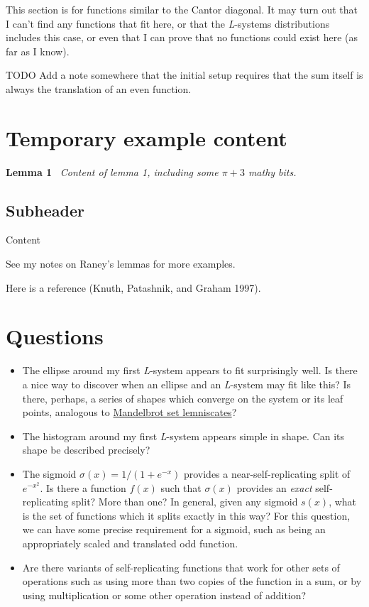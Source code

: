 \documentclass[20pt,]{extarticle}
\providecommand{\tightlist}{%
  \setlength{\itemsep}{0pt}\setlength{\parskip}{0pt}}
\begin{document}
This section is for functions similar to the Cantor diagonal. It may
turn out that I can't find any functions that fit here, or that the
\emph{L}-systems distributions includes this case, or even that I can
prove that no functions could exist here (as far as I know).

TODO Add a note somewhere that the initial setup requires that the sum
itself is always the translation of an even function.

\section{Temporary example content}\label{temporary-example-content}

\textbf{Lemma 1}~ \emph{Content of lemma 1, including some \(\pi+3\)
mathy bits.}

\subsection{Subheader}\label{subheader}

Content

See my notes on Raney's lemmas for more examples.

Here is a reference (Knuth, Patashnik, and Graham 1997).

\section{Questions}\label{questions}

\begin{itemize}
\tightlist
\item
  The ellipse around my first \emph{L}-system appears to fit
  surprisingly well. Is there a nice way to discover when an ellipse and
  an \emph{L}-system may fit like this? Is there, perhaps, a series of
  shapes which converge on the system or its leaf points, analogous to
  \href{http://mathworld.wolfram.com/MandelbrotSetLemniscate.html}{Mandelbrot
  set lemniscates}?
\item
  The histogram around my first \emph{L}-system appears simple in shape.
  Can its shape be described precisely?
\item
  The sigmoid \(\sigma(x)=1/(1+e^{-x})\) provides a
  near-self-replicating split of \(e^{-x^2}\). Is there a function
  \(f(x)\) such that \(\sigma(x)\) provides an \emph{exact}
  self-replicating split? More than one? In general, given any sigmoid
  \(s(x)\), what is the set of functions which it splits exactly in this
  way? For this question, we can have some precise requirement for a
  sigmoid, such as being an appropriately scaled and translated odd
  function.
\item
  Are there variants of self-replicating functions that work for other
  sets of operations such as using more than two copies of the function
  in a sum, or by using multiplication or some other operation instead
  of addition?
\end{itemize}
\end{document}
